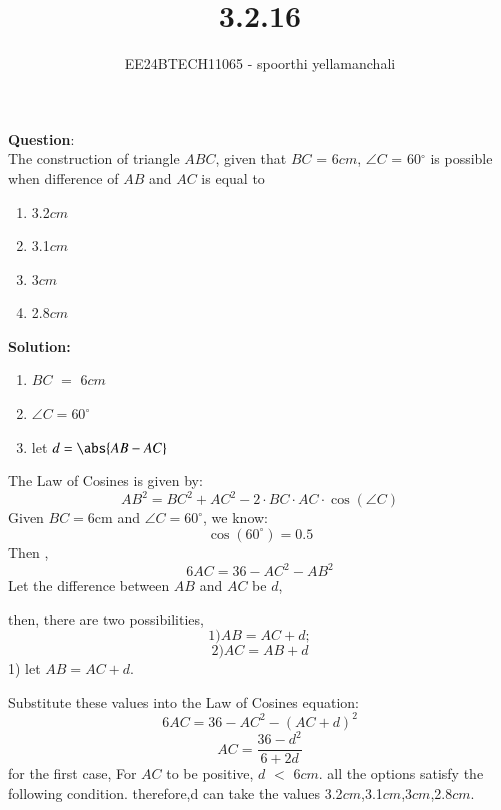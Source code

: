\documentclass[journal]{IEEEtran}
\begin{document}

\vspace{3cm}

\title{3.2.16}
\author{EE24BTECH11065 - spoorthi yellamanchali}
{\let\newpage\relax\maketitle}

\renewcommand{\thefigure}{\theenumi}
\renewcommand{\thetable}{\theenumi}
\setlength{\intextsep}{10pt} %


\renewcommand{\thetable}{\theenumi}


\textbf{Question}:\\
The construction of triangle $ABC$, given that $BC$ = 6$cm$, $\angle C$ = 60$^\circ$ is possible when difference of $AB$ and $AC$ is equal to
\begin{enumerate}
    \item 3.2$cm$
    \item 3.1$cm$
    \item 3$cm$
    \item 2.8$cm$
\end{enumerate}

\textbf{Solution: }
\begin{table}[h!]    
  \centering
  
  \caption{Variables Used}
  \label{tab10.5.3.9.1}
\end{table}
\begin{enumerate}
    \item  $BC$  $=$ 6$cm$
 \item $\angle C = 60^\circ$
  \item let $d = \abs{ AB-AC}$
\end{enumerate}
    

    The Law of Cosines is given by:
\[
AB^2 = BC^2 + AC^2 - 2 \cdot BC \cdot AC \cdot \cos(\angle C)
\]
Given $BC = 6  \text{cm}$ and $\angle C = 60^\circ$, we know:
\[
\cos(60^\circ) = 0.5
\]
Then , 
\[
6AC = 36 - AC^2 - AB^2
\]
Let the difference between $AB$ and $AC$ be $d$,

then,
there are two possibilities,
\[
 1) AB = AC + d ;
\]
\[
2) AC = AB + d
\]
1)  let $AB = AC + d$.

Substitute these values into the Law of Cosines equation:
\[
6AC = 36 - AC^2 - (AC + d)^2 
\]
\[
AC = \frac{36 - d^2}{6 + 2d}
\]
for the first case,
For $AC$ to be positive, $d$ $<$ 6$cm$.
all the options satisfy the following condition.
therefore,d can take the values 3.2$cm$,3.1$cm$,3$cm$,2.8$cm$.
\end{document}
